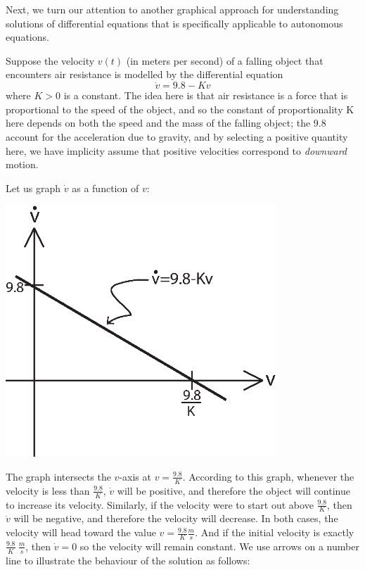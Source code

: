 \documentclass[12pt,letterpaper,twoside]{amsart}
\newcounter{example}
\newcommand{\example}{\bigskip \noindent {\large {\sc Example \arabic{example}:}} \addtocounter{example}{1}}
\begin{document}
Next, we turn our attention to another graphical approach for understanding solutions of differential equations that is specifically applicable to autonomous equations.

\example Suppose the velocity $v(t)$ (in meters per second) of a falling object that encounters air resistance is modelled by the differential equation
\[ \dot{v} = 9.8-Kv\]
where $K>0$ is a constant.  The idea here is that air resistance is a force that is proportional to the speed of the object, and so the constant of proportionality K here depends on both the speed and the mass of the falling object; the $9.8$ account for the acceleration due to gravity, and by selecting a positive quantity here, we have implicity assume that positive velocities correspond to {\it downward} motion.  

Let us graph $\dot{v}$ as a function of $v$:

\begin{center}
\includegraphics[width=4in]{phaseline1.eps}
\end{center}

The graph intersects the $v$-axis at $v=\frac{9.8}{K}$.  According to this graph, whenever the velocity is less than $\frac{9.8}{K}$, $\dot{v}$ will be positive, and therefore the object will continue to increase its velocity.  Similarly, if the velocity were to start out above $\frac{9.8}{K}$, then $\dot{v}$ will be negative, and therefore the velocity will decrease.  In both cases, the velocity will head toward the value $v=\frac{9.8}{K} \frac{m}{s}$.  And if the initial velocity is exactly $\frac{9.8}{K} \ \frac{m}{s}$, then $\dot{v}=0$ so the velocity will remain constant. We use arrows on a number line to illustrate the behaviour of the solution as follows:
\end{document}
